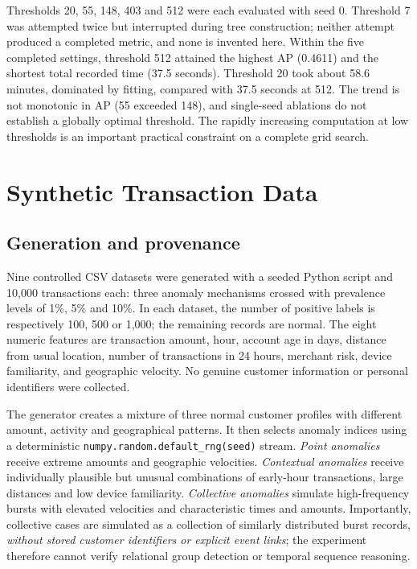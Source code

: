 \documentclass[11pt]{article}
\begin{document}
Thresholds 20, 55, 148, 403 and 512 were each evaluated with seed 0. Threshold 7 was attempted twice but interrupted during tree construction; neither attempt produced a completed metric, and none is invented here. Within the five completed settings, threshold 512 attained the highest AP (0.4611) and the shortest total recorded time (37.5 seconds). Threshold 20 took about 58.6 minutes, dominated by fitting, compared with 37.5 seconds at 512. The trend is not monotonic in AP (55 exceeded 148), and single-seed ablations do not establish a globally optimal threshold. The rapidly increasing computation at low thresholds is an important practical constraint on a complete grid search.
 
\section{Synthetic Transaction Data}
\subsection{Generation and provenance}
Nine controlled CSV datasets were generated with a seeded Python script and 10,000 transactions each: three anomaly mechanisms crossed with prevalence levels of 1\%, 5\% and 10\%. In each dataset, the number of positive labels is respectively 100, 500 or 1,000; the remaining records are normal. The eight numeric features are transaction amount, hour, account age in days, distance from usual location, number of transactions in 24 hours, merchant risk, device familiarity, and geographic velocity. No genuine customer information or personal identifiers were collected.
 
The generator creates a mixture of three normal customer profiles with different amount, activity and geographical patterns. It then selects anomaly indices using a deterministic \texttt{numpy.random.default\_rng(seed)} stream. \emph{Point anomalies} receive extreme amounts and geographic velocities. \emph{Contextual anomalies} receive individually plausible but unusual combinations of early-hour transactions, large distances and low device familiarity. \emph{Collective anomalies} simulate high-frequency bursts with elevated velocities and characteristic times and amounts. Importantly, collective cases are simulated as a collection of similarly distributed burst records, \emph{without stored customer identifiers or explicit event links}; the experiment therefore cannot verify relational group detection or temporal sequence reasoning.
 
\end{document}
